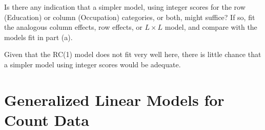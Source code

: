 \documentclass[10pt]{report}\usepackage[]{graphicx}\usepackage[]{color}
\newenvironment{knitrout}{}{} %
\renewenvironment{knitrout}{\small\renewcommand{\baselinestretch}{.85}}{} %
\begin{document}
\begin{Exercises}
\begin{enumerate*}
\begin{ans}
\begin{knitrout}
\end{knitrout}
    \end{ans}
    
    \item Is there any indication that a simpler model, using integer scores for
    the row (Education) or column (Occupation) categories, or both, might suffice?
    If so, fit the analogous column effects, row effects, or $L \times L$ model,
    and compare with the models fit in part (a).
    \begin{ans}
    Given that the RC(1) model does not fit very well here, there is little chance
    that a simpler model using integer scores would be adequate.
    \end{ans}
    
  \end{enumerate*}


\end{Exercises}

\clearpage
\chapter{Generalized Linear Models for Count Data}\label{ch:glm}
\end{document}
